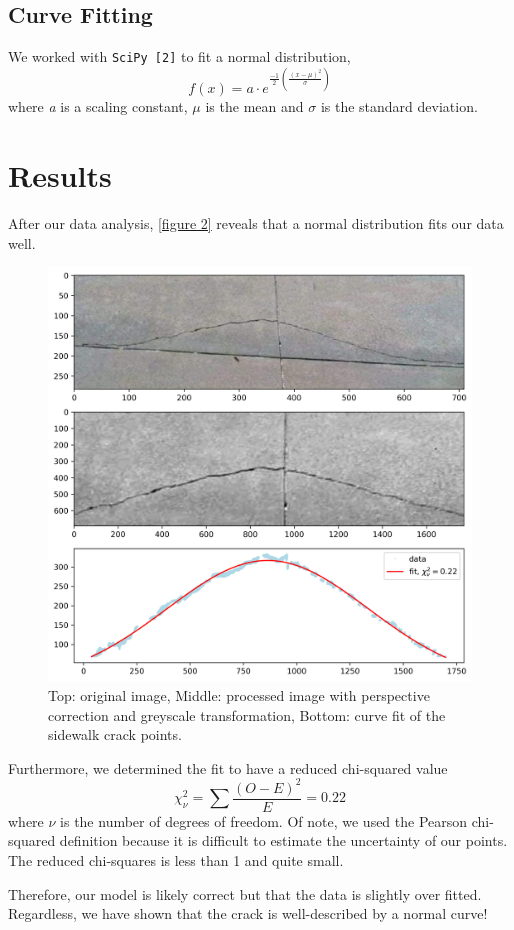 \documentclass{article}
\begin{document}
\subsection{Curve Fitting}
We worked with \texttt{SciPy [2]} to fit a normal distribution,
\begin{equation}
    f(x) = a \cdot e^{\frac{-1}{2} \left(\frac{(x - \mu)^2}{\sigma}\right)}
\end{equation}
where \textit{a} is a scaling constant, \( \mu \) is the mean and \( \sigma \) is the standard deviation.
\section{Results}
After our data analysis, \autoref{figure 2} reveals that a normal distribution fits our data well.
\begin{figure}[H]
    \centering
    \includegraphics[width=13cm\linewidth]{fit.png}
    \caption{Top: original image, Middle: processed image with perspective correction and greyscale transformation, Bottom: curve fit of the sidewalk crack points.}
    \label{figure 2}
\end{figure}
Furthermore, we determined the fit to have a reduced chi-squared value
\begin{equation}   
\chi^2_{\nu} = \sum \frac{(O - E)^2}{E} = 0.22
\end{equation}
where \( \nu \) is the number of degrees of freedom. Of note, we used the Pearson chi-squared definition because it
is difficult to estimate the uncertainty of our points.
The reduced chi-squares is less than 1 and quite small. 


Therefore, our model is likely correct but that the
data is slightly over fitted. Regardless, we have shown that the crack is well-described by a normal curve!




\nocite{*}
\end{document}
